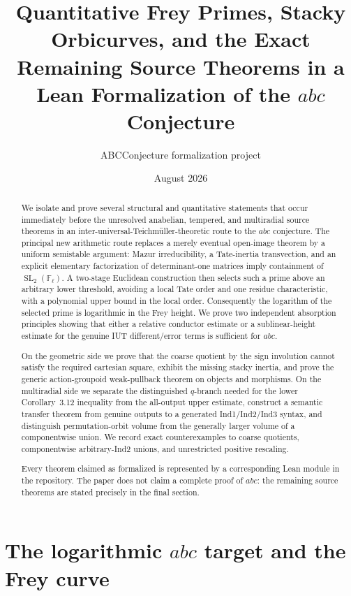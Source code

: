 \documentclass[11pt]{article}
\title{Quantitative Frey Primes, Stacky Orbicurves, and the Exact Remaining Source Theorems in a Lean Formalization of the $abc$ Conjecture}
\author{ABCConjecture formalization project}
\date{August 2026}
\newcommand{\F}{\mathbb F}
\newcommand{\SL}{\operatorname{SL}}
\begin{document}
\maketitle

\begin{abstract}
We isolate and prove several structural and quantitative statements that occur
immediately before the unresolved anabelian, tempered, and multiradial source
theorems in an inter-universal-Teichm\"uller-theoretic route to the
$abc$ conjecture.  The principal new arithmetic route replaces a merely
eventual open-image theorem by a uniform semistable argument: Mazur
irreducibility, a Tate-inertia transvection, and an explicit elementary
factorization of determinant-one matrices imply containment of
$\SL_2(\F_\ell)$.  A two-stage Euclidean construction then selects such a
prime above an arbitrary lower threshold, avoiding a local Tate order and one
residue characteristic, with a polynomial upper bound in the local order.
Consequently the logarithm of the selected prime is logarithmic in the Frey
height.  We prove two independent absorption principles showing that either a
relative conductor estimate or a sublinear-height estimate for the genuine
IUT different/error terms is sufficient for $abc$.

On the geometric side we prove that the coarse quotient by the sign
involution cannot satisfy the required cartesian square, exhibit the missing
stacky inertia, and prove the generic action-groupoid weak-pullback theorem on
objects and morphisms.  On the multiradial side we separate the distinguished
$q$-branch needed for the lower Corollary~3.12 inequality from the all-output
upper estimate, construct a semantic transfer theorem from genuine outputs to
a generated Ind1/Ind2/Ind3 syntax, and distinguish permutation-orbit volume
from the generally larger volume of a componentwise union.  We record exact
counterexamples to coarse quotients, componentwise arbitrary-Ind2 unions, and
unrestricted positive rescaling.

Every theorem claimed as formalized is represented by a corresponding Lean
module in the repository.  The paper does not claim a complete proof of
$abc$: the remaining source theorems are stated precisely in the final
section.
\end{abstract}

\section{The logarithmic $abc$ target and the Frey curve}
\end{document}
